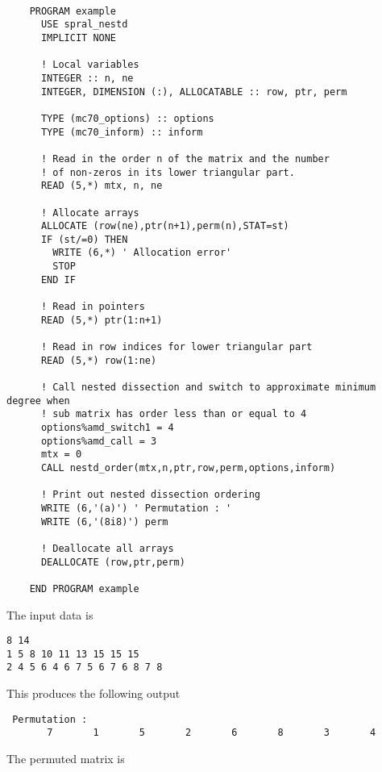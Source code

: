 \def\baselinestretch{0.8}
{\small \begin{verbatim}

    PROGRAM example
      USE spral_nestd
      IMPLICIT NONE

      ! Local variables
      INTEGER :: n, ne
      INTEGER, DIMENSION (:), ALLOCATABLE :: row, ptr, perm

      TYPE (mc70_options) :: options
      TYPE (mc70_inform) :: inform

      ! Read in the order n of the matrix and the number
      ! of non-zeros in its lower triangular part.
      READ (5,*) mtx, n, ne

      ! Allocate arrays
      ALLOCATE (row(ne),ptr(n+1),perm(n),STAT=st)
      IF (st/=0) THEN
        WRITE (6,*) ' Allocation error'
        STOP
      END IF

      ! Read in pointers
      READ (5,*) ptr(1:n+1)

      ! Read in row indices for lower triangular part
      READ (5,*) row(1:ne)

      ! Call nested dissection and switch to approximate minimum degree when
      ! sub matrix has order less than or equal to 4
      options%amd_switch1 = 4
      options%amd_call = 3
      mtx = 0
      CALL nestd_order(mtx,n,ptr,row,perm,options,inform)

      ! Print out nested dissection ordering
      WRITE (6,'(a)') ' Permutation : '
      WRITE (6,'(8i8)') perm

      ! Deallocate all arrays
      DEALLOCATE (row,ptr,perm)

    END PROGRAM example
\end{verbatim}  }
\def\baselinestretch{1.0}
\medskip

\noindent
{ The input data is}

\def\baselinestretch{0.8}
{\small  \begin{verbatim}
8 14
1 5 8 10 11 13 15 15 15
2 4 5 6 4 6 7 5 6 7 6 8 7 8

\end{verbatim}  }
\medskip

\noindent
{This produces the following output}

\def\baselinestretch{0.8}
{\small { \begin{verbatim}
 Permutation :  
       7       1       5       2       6       8       3       4

\end{verbatim} } }
\medskip

\noindent
{\rm The permuted matrix is}

